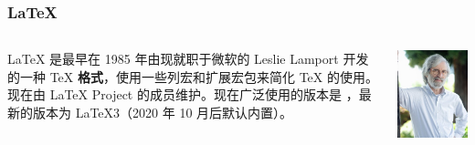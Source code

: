 \begin{frame}
  \frametitle{\LaTeX{}}
  \begin{columns}[c]
    \begin{column}{0.7\textwidth}
      \begin{center}
        \rmfamily\Huge
        \highlight[structure]{\LaTeX{}}
      \end{center}
      \begin{center}
        \parbox{0.75\textwidth}{
          \LaTeX{} 是最早在 1985 年由现就职于微软的 Leslie Lamport 开发的一种 \TeX{} \textbf{格式}\footnotemark，使用一些列宏和扩展宏包来简化 \TeX{} 的使用。现在由 \LaTeX{} Project 的成员维护。现在广泛使用的版本是 \LaTeXe{}，最新的版本为 \LaTeX3（2020 年 10 月后默认内置）。
        }
      \end{center}
    \end{column}
    \begin{column}{0.3\textwidth}
      \includegraphics[width=.8\columnwidth]{support/images/Lamport.jpg}
    \end{column}
  \end{columns}
\end{frame}

